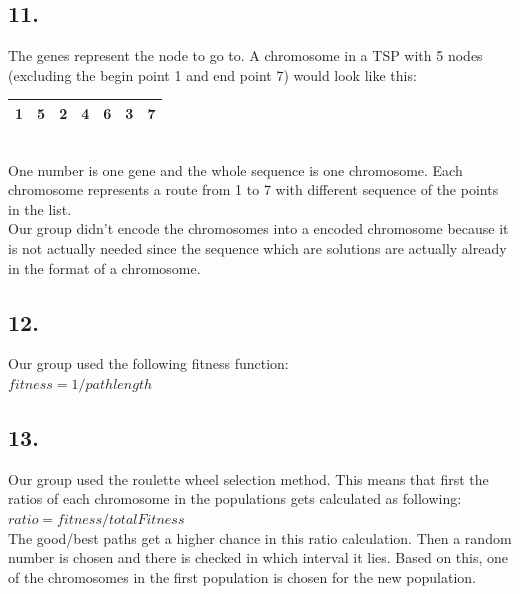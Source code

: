 \documentclass{scrartcl}
\begin{document}
\subsection*{11.}
The genes represent the node to go to. A chromosome in a TSP with 5 nodes \\(excluding the begin point 1 and end point 7) would look like this: \\
\begin{tabular}{ | l | l | l | l | l | l | l |}
  \hline			
  1 & 5 & 2 & 4 & 6 & 3 & 7  \\
  \hline  
\end{tabular}\\
One number is one gene and the whole sequence is one chromosome. Each chromosome represents a route from 1 to 7 with different sequence of the points in the list.
\\
Our group didn't encode the chromosomes into a encoded chromosome because it is not actually needed since the sequence which are solutions are actually already in the format of a chromosome.

\subsection*{12.}
Our group used the following fitness function:\\
$fitness = 1/pathlength$

\subsection*{13.}
Our group used the roulette wheel selection method. This means that first the ratios of each chromosome in the populations gets calculated as following: \\
$ratio = fitness / totalFitness$\\
The good/best paths get a higher chance in this ratio calculation. Then a random number is chosen and there is checked in which interval it lies. Based on this, one of the chromosomes in the first population is chosen for the new population.
\end{document}
